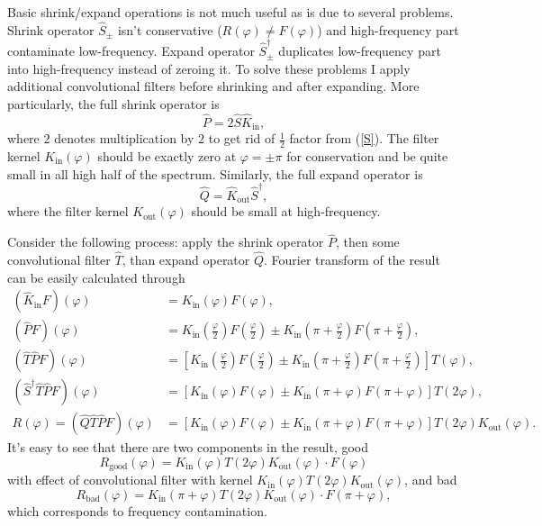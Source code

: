 \documentclass[10pt]{article}
\begin{document}
Basic shrink/expand operations is not much useful as is due to several problems. Shrink operator
$\hat S_\pm$ isn't conservative ($R(\varphi)\neq F(\varphi)$) and high-frequency part contaminate
low-frequency. Expand operator $\hat S^\dagger_\pm$ duplicates low-frequency part into
high-frequency instead of zeroing it. To solve these problems I apply additional convolutional
filters before shrinking and after expanding. More particularly, the full shrink operator is
\begin{equation}\label{P}
    \hat P = 2\hat S\hat K_{\text{in}},
\end{equation}
where $2$ denotes multiplication by $2$ to get rid of $\frac12$ factor from (\ref{S}). The filter
kernel $K_{\text{in}}(\varphi)$ should be exactly zero at $\varphi = \pm\pi$ for conservation and be
quite small in all high half of the spectrum. Similarly, the full expand operator is
\begin{equation}\label{Q}
    \hat Q = \hat K_{\text{out}}\hat S^\dagger,
\end{equation}
where the filter kernel $K_{\text{out}}(\varphi)$ should be small at high-frequency.

Consider the following process: apply the shrink operator $\hat P$, then some convolutional filter
$\hat T$, than expand operator $\hat Q$. Fourier transform of the result can be easily calculated through
\begin{align}
    (\hat K_{\text{in}}F)(\varphi) &= K_{\text{in}}(\varphi)F(\varphi),\\
    (\hat PF)(\varphi) &=
        K_{\text{in}}\left(\frac\varphi2\right)F\left(\frac\varphi2\right) \pm
        K_{\text{in}}\left(\pi+\frac\varphi2\right)F\left(\pi+\frac\varphi2\right),\\
    (\hat T\hat PF)(\varphi) &= \left[
        K_{\text{in}}\left(\frac\varphi2\right)F\left(\frac\varphi2\right) \pm
        K_{\text{in}}\left(\pi+\frac\varphi2\right)F\left(\pi+\frac\varphi2\right)
        \right]T(\varphi),\\
    (\hat S^\dagger\hat T\hat PF)(\varphi) &= \left[K_{\text{in}}(\varphi)F(\varphi) \pm
        K_{\text{in}}(\pi+\varphi)F(\pi+\varphi)\right]T(2\varphi),\\
    R(\varphi) = (\hat Q\hat T\hat PF)(\varphi) &= \left[K_{\text{in}}(\varphi)F(\varphi) \pm
        K_{\text{in}}(\pi+\varphi)F(\pi+\varphi)\right]T(2\varphi)K_{\text{out}}(\varphi).
\end{align}
It's easy to see that there are two components in the result, good
\begin{equation}
    R_{\text{good}}(\varphi) =
        K_{\text{in}}(\varphi)T(2\varphi)K_{\text{out}}(\varphi)\cdot F(\varphi)
\end{equation}
with effect of convolutional filter with kernel
$K_{\text{in}}(\varphi)T(2\varphi)K_{\text{out}}(\varphi)$, and bad
\begin{equation}
    R_{\text{bad}}(\varphi) =
        K_{\text{in}}(\pi+\varphi)T(2\varphi)K_{\text{out}}(\varphi)\cdot F(\pi+\varphi),
\end{equation}
which corresponds to frequency contamination.
\end{document}
